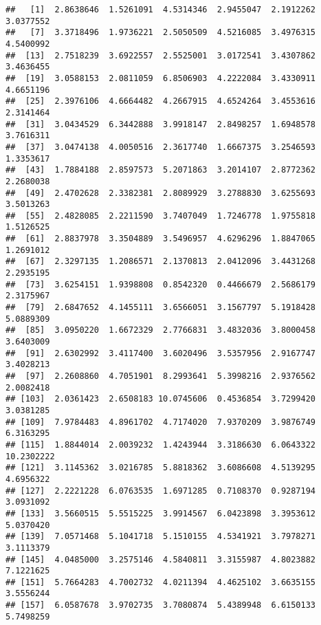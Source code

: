 \documentclass[
]{article}
\newenvironment{Shaded}{\begin{snugshade}}{\end{snugshade}}
\newcommand{\DataTypeTok}[1]{\textcolor[rgb]{0.13,0.29,0.53}{#1}}
\newcommand{\DecValTok}[1]{\textcolor[rgb]{0.00,0.00,0.81}{#1}}
\newcommand{\KeywordTok}[1]{\textcolor[rgb]{0.13,0.29,0.53}{\textbf{#1}}}
\newcommand{\NormalTok}[1]{#1}
\newcommand{\OperatorTok}[1]{\textcolor[rgb]{0.81,0.36,0.00}{\textbf{#1}}}
\newcommand{\StringTok}[1]{\textcolor[rgb]{0.31,0.60,0.02}{#1}}
\begin{document}
\begin{Shaded}
\end{Shaded}

\begin{verbatim}
##   [1]  2.8638646  1.5261091  4.5314346  2.9455047  2.1912262  3.0377552
##   [7]  3.3718496  1.9736221  2.5050509  4.5216085  3.4976315  4.5400992
##  [13]  2.7518239  3.6922557  2.5525001  3.0172541  3.4307862  3.4636455
##  [19]  3.0588153  2.0811059  6.8506903  4.2222084  3.4330911  4.6651196
##  [25]  2.3976106  4.6664482  4.2667915  4.6524264  3.4553616  2.3141464
##  [31]  3.0434529  6.3442888  3.9918147  2.8498257  1.6948578  3.7616311
##  [37]  3.0474138  4.0050516  2.3617740  1.6667375  3.2546593  1.3353617
##  [43]  1.7884188  2.8597573  5.2071863  3.2014107  2.8772362  2.2680038
##  [49]  2.4702628  2.3382381  2.8089929  3.2788830  3.6255693  3.5013263
##  [55]  2.4828085  2.2211590  3.7407049  1.7246778  1.9755818  1.5126525
##  [61]  2.8837978  3.3504889  3.5496957  4.6296296  1.8847065  1.2691012
##  [67]  2.3297135  1.2086571  2.1370813  2.0412096  3.4431268  2.2935195
##  [73]  3.6254151  1.9398808  0.8542320  0.4466679  2.5686179  2.3175967
##  [79]  2.6847652  4.1455111  3.6566051  3.1567797  5.1918428  5.0889309
##  [85]  3.0950220  1.6672329  2.7766831  3.4832036  3.8000458  3.6403009
##  [91]  2.6302992  3.4117400  3.6020496  3.5357956  2.9167747  3.4028213
##  [97]  2.2608860  4.7051901  8.2993641  5.3998216  2.9376562  2.0082418
## [103]  2.0361423  2.6508183 10.0745606  0.4536854  3.7299420  3.0381285
## [109]  7.9784483  4.8961702  4.7174020  7.9370209  3.9876749  6.3163295
## [115]  1.8844014  2.0039232  1.4243944  3.3186630  6.0643322 10.2302222
## [121]  3.1145362  3.0216785  5.8818362  3.6086608  4.5139295  4.6956322
## [127]  2.2221228  6.0763535  1.6971285  0.7108370  0.9287194  3.0931092
## [133]  3.5660515  5.5515225  3.9914567  6.0423898  3.3953612  5.0370420
## [139]  7.0571468  5.1041718  5.1510155  4.5341921  3.7978271  3.1113379
## [145]  4.0485000  3.2575146  4.5840811  3.3155987  4.8023882  7.1221625
## [151]  5.7664283  4.7002732  4.0211394  4.4625102  3.6635155  3.5556244
## [157]  6.0587678  3.9702735  3.7080874  5.4389948  6.6150133  5.7498259

\end{verbatim}
\end{document}
